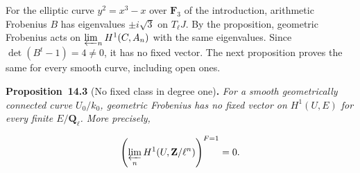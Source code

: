 \documentclass[11pt]{article}
\newenvironment{bpstatement}[2]{\par\addvspace{0.6\baselineskip}\noindent\textbf{#1}#2\textbf{.}\enspace\ignorespaces}
  {\par\addvspace{0.4\baselineskip}}
\newenvironment{bpstatementit}[2]{\begin{bpstatement}{#1}{#2}\itshape\ignorespaces}{\end{bpstatement}}
\begin{document}
\label{bp12}%
For the elliptic curve \(y^2=x^3-x\) over \(\mathbf F_3\) of the introduction, arithmetic Frobenius \(B\) has eigenvalues \(\pm i\sqrt3\) on \(T_\ell J\). By the proposition, geometric Frobenius acts on \(\varprojlim_nH^1(C,A_n)\) with the same eigenvalues. Since \(\det(B^t-1)=4\ne0\), it has no fixed vector. The next proposition proves the same for every smooth curve, including open ones.

\label{bp13}%
\begin{bpstatementit}{Proposition~14.3}{ (No fixed class in degree one)}
For a smooth geometrically connected curve \(U_0/k_0\), geometric Frobenius has no fixed vector on \(H^1(U,E)\) for every finite \(E/\mathbf Q_\ell\).  More precisely,

\[
\left(\varprojlim_nH^1(U,\mathbf Z/\ell^n)\right)^{F=1}=0.
\]
\end{bpstatementit}
\end{document}
